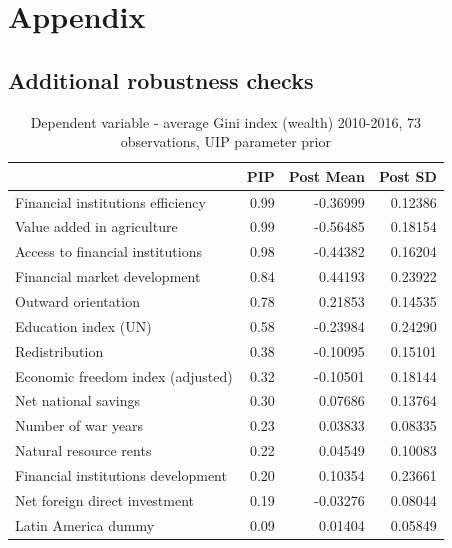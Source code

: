 \documentclass[a4paper,11pt]{article}
\begin{document}
\clearpage
%


%
\clearpage
%
\appendix
\section{Appendix}
\label{sec:app}

\renewcommand{\thesection}{A\arabic{section}}%
\renewcommand{\thetable}{A\arabic{table}}%
\renewcommand{\thefigure}{A\arabic{figure}}%
\renewcommand{\theequation}{A\arabic{equation}}%
\setcounter{equation}{0}%
\setcounter{table}{0}%
\setcounter{figure}{0}%

\subsection*{Additional robustness checks}
\label{sec:app_rch}
\begin{table}[!ht]
\footnotesize
\centering
\caption{Dependent variable - average Gini index (wealth) 2010-2016, 73 observations, UIP parameter prior}
\label{table:res2}
\begin{tabular}{lrrr}
  \toprule
 & PIP & Post Mean & Post SD \\ 
  \midrule
  Financial institutions efficiency & 0.99 & -0.36999 & 0.12386 \\ 
  Value added in agriculture & 0.99 & -0.56485 & 0.18154 \\ 
  Access to financial institutions & 0.98 & -0.44382 & 0.16204 \\ 
  Financial market development & 0.84 & 0.44193 & 0.23922 \\ 
  Outward orientation & 0.78 & 0.21853 & 0.14535 \\ 
  Education index (UN) & 0.58 & -0.23984 & 0.24290 \\ 
  Redistribution & 0.38 & -0.10095 & 0.15101 \\ 
  Economic freedom index (adjusted) & 0.32 & -0.10501 & 0.18144 \\ 
  Net national savings & 0.30 & 0.07686 & 0.13764 \\ 
  Number of war years & 0.23 & 0.03833 & 0.08335 \\ 
  Natural resource rents & 0.22 & 0.04549 & 0.10083 \\ 
  Financial institutions development & 0.20 & 0.10354 & 0.23661 \\ 
  Net foreign direct investment & 0.19 & -0.03276 & 0.08044 \\ 
  Latin America dummy & 0.09 & 0.01404 & 0.05849 \\ 

\end{tabular}
\end{table}
\end{document}

